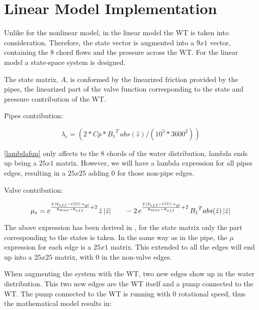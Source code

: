 \section{Linear Model Implementation} 
\label{MatlabScriptLinear}

Unlike for the nonlinear model, in the linear model the WT is taken into consideration. Therefore, the state vector is augmented into a $9x1$ vector, 
containing the 8 chord flows and the pressure across the WT. For the linear model a state-space system is designed.

The state matrix, $A$, is conformed by the linearized friction provided by the pipes, the linearized part of the valve function corresponding to the state and pressure contribution
of the WT.

Pipes contribution:

\begin{equation}
  {\lambda}_e = (2 * Cp * {B_1}^{T} \, abs(\hat{z}) /(10^5*3600^2))
  \label{lambdafun}
\end{equation}

\eqref{lambdafun} only affects to the 8 chords of the water distribution, lambda ends up being a $25x1$ matrix. However, we will have a lambda expression for all pipes
edges, resulting in a $25x25$ adding $0$ for those non-pipe edges. 

Valve contribution:

\vspace{4mm}
\begin{equation}
  {\mu}_e = e^{\frac{2 \, (\theta_{off} - \bar{OD}) \, n_{gl}}{\theta_{max}-\theta_{off}}+2} \, \bar{z} \, |\bar{z}| \quad \quad - \\
  2 \, e^{\frac{2 \, (\theta_{off} - \bar{OD}) \, n_{gl}}{\theta_{max}-\theta_{off}}+2} \, {B_1}^{T} abs(\hat{z}) \, |\bar{z}|
  \label{mufun}
\end{equation}

The above expression has been derived in , for the state matrix only the part corresponding to the states is taken. In the same way 
as in the pipe, the $\mu$ expression for each edge is a $25x1$ matrix. This extended to all the edges will end up into a $25x25$ matrix, with $0$ in the 
non-valve edges. 

When augmenting the system with the WT, two new edges show up in the water distribution. This two new edges are the WT itself and a pump connected to the WT.
The pump connected to the WT is running with $0$ rotational speed, thus the mathematical model results in:

